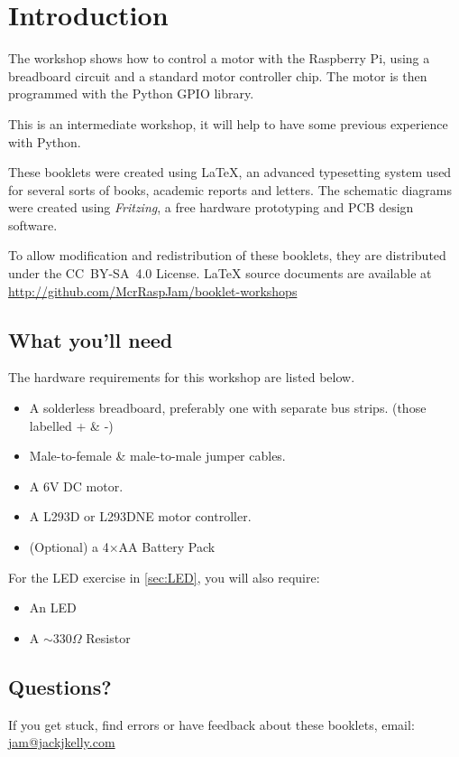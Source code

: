 \setcounter{section}{-1}
\section{Introduction}
	
	
	The workshop shows how to control a motor with the Raspberry Pi, using a breadboard circuit and a standard motor controller chip. The motor is then programmed with the Python GPIO library.

	This is an intermediate workshop, it will help to have some previous experience with Python.
		
	These booklets were created using {\selectfont \LaTeX}, an advanced typesetting system used for several sorts of books, academic reports and letters. The schematic diagrams were created using \textit{Fritzing}, a free hardware prototyping and PCB design software.
		
	To allow modification and redistribution of these booklets, they are distributed under the \hbox{CC BY-SA 4.0} License. LaTeX source documents are available at \url{http://github.com/McrRaspJam/booklet-workshops}
	
	
	\subsection*{What you'll need}
		
			
		The hardware requirements for this workshop are listed below.
	
		\begin{itemize}[nosep]		
			\item A solderless breadboard, preferably one with separate bus strips. (those labelled + \& -)
			\item Male-to-female \& male-to-male jumper cables.
			\item A 6V DC motor.
			\item A L293D or L293DNE motor controller.
			\item (Optional) a 4$\times$AA Battery Pack				
		\end{itemize}

		For the LED exercise in \autoref{sec:LED}, you will also require:
			
		\begin{itemize}[nosep]	
			\item An LED
			\item A $\sim 330 \Omega$ Resistor
		\end{itemize}
				
	
			
	
		
	\subsection*{Questions?}
		If you get stuck, find errors or have feedback about these booklets, email:
		\url{jam@jackjkelly.com}\label{email}